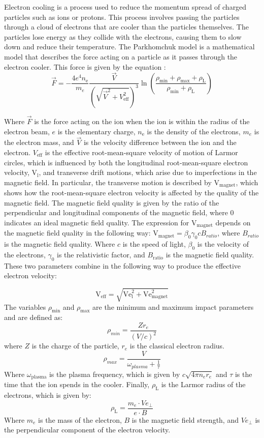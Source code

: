 Electron cooling is a process used to reduce the momentum spread of charged particles such as ions or protons. This process involves passing the particles through a cloud of electrons that are cooler than the particles themselves. The particles lose energy as they collide with the electrons, causing them to slow down and reduce their temperature. The Parkhomchuk model is a mathematical model that describes the force acting on a particle as it passes through the electron cooler. This force is given by the equation \cite{parkhomchuk2000electron}:
\begin{equation}
\vec{F}= -\frac{4 e^4 n_{\mathrm{e}}}{m_e} \frac{\vec{V}}{\left(\sqrt{\vec{V}^2+V_{\mathrm{eff}}^2}\right)^3} \ln \left(\frac{\rho_{\min }+\rho_{\max }+\rho_{\mathrm{L}}}{\rho_{\min }+\rho_{\mathrm{L}}}\right)
\label{Eq:Parkhomchuk}
\end{equation}

Where $\vec{F}$ is the force acting on the ion when the ion is within the radius of the electron beam, $e$ is the elementary charge, $n_\mathrm{e}$ is the density of the electrons, $m_e$ is the electron mass, and $\vec{V}$ is the velocity difference between the ion and the electron. $V_\mathrm{eff}$ is the effective root-mean-square velocity of motion of Larmor circles, which is influenced by both the longitudinal root-mean-square electron velocity, $\mathrm{V}_\mathrm{l}$, and transverse drift motions, which arise due to imperfections in the magnetic field. In particular, the transverse motion is described by $\mathrm{V}_\mathrm{magnet}$, which shows how the root-mean-square electron velocity is affected by the quality of the magnetic field. The magnetic field quality is given by the ratio of the perpendicular and longitudinal components of the magnetic field, where 0 indicates an ideal magnetic field quality. The expression for $\mathrm{V}_\mathrm{magnet}$ depends on the magnetic field quality in the following way: $\mathrm{V}_\mathrm{magnet} = \beta_0 \gamma_0  c B_{ratio}$, where $B_{ratio}$ is the magnetic field quality. Where $c$ is the speed of light, $\beta_0$ is the velocity of the electrons, $\gamma_0$ is the relativistic factor, and $B_\mathrm{ratio}$ is the magnetic field quality. These two parameters combine in the following way to produce the effective electron velocity:

$$\mathrm{V}_{\mathrm{eff}} = \sqrt{\mathrm{Ve}_\mathrm{l}^2 + \mathrm{Ve}_\mathrm{magnet}^2}$$
The variables $\rho_{\min}$ and $\rho_{\max}$ are the minimum and maximum impact parameters and are defined as:
$$\rho_{min} = \frac{Z r_e}{(V/c)^2}$$
where $Z$ is the charge of the particle, $r_e$ is the classical electron radius.
$$\rho_{max} = \frac{V}{\omega_{plasma}+\frac{1}{\tau}}$$
Where $\omega_{\mathrm{plasma}}$ is the plasma frequency, which is given by $c \sqrt{4  \pi  n_e  r_e}$ and $\tau$ is the time that the ion spends in the cooler. Finally, $\rho_{\mathrm{L}}$ is the Larmor radius of the electrons, which is given by:
$$\rho_{\mathrm{L}}=\frac{m_e \cdot Ve_{\perp}}{e \cdot B}$$
Where $m_e$ is the mass of the electron, $B$ is the magnetic field strength, and $Ve_{\perp}$ is the perpendicular component of the electron velocity.

